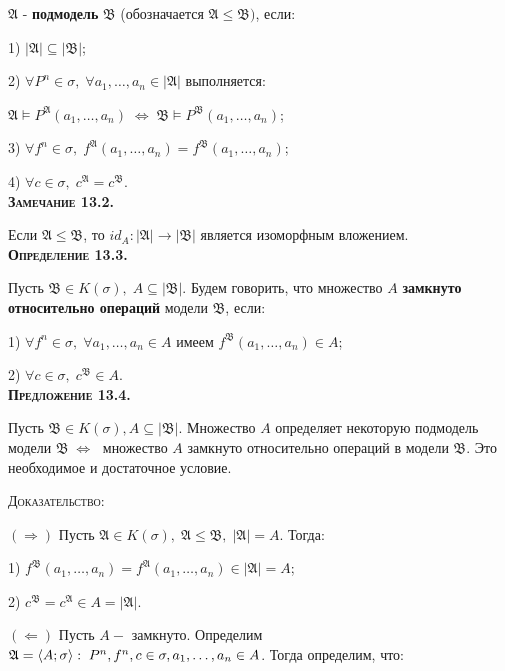 \documentclass[18pt, a4paper]{extarticle}
\begin{document}
$\mathfrak{A}$ -  \textbf{подмодель} $\mathfrak{B}$ (обозначается $\mathfrak{A}\leqslant\mathfrak{B})$, если:

1) $|\mathfrak{A}|\subseteq |\mathfrak{B}|$;

2) $\forall P^n\in\sigma,\;\forall a_1,\dots,a_n\in|\mathfrak{A}|$ выполняется:

\qquad$\mathfrak{A}\vDash P^{\mathfrak{A}}(a_1,\dots,a_n)\;\Leftrightarrow\;\mathfrak{B}\vDash P^{\mathfrak{B}}(a_1,\dots,a_n)$;

3) $\forall f^n\in\sigma,\; f^{\mathfrak{A}}(a_1,\dots,a_n)=f^{\mathfrak{B}}(a_1,\dots,a_n)$;

4) $\forall c\in\sigma,\; c^{\mathfrak{A}}=c^{\mathfrak{B}}$.\\

\textbf{\textsc{Замечание 13.2.}} 

Если $\mathfrak{A}\leqslant\mathfrak{B}$, то $id_A:|\mathfrak{A}|\to|\mathfrak{B}|$ является изоморфным вложением.\\

\textbf{\textsc{Определение 13.3.}} 

Пусть $\mathfrak{B}\in K(\sigma), \;A\subseteq|\mathfrak{B}|$. Будем говорить, что множество $A$ \textbf{замкнуто относительно операций}
 модели $\mathfrak{B}$, если:
 
 1) $\forall f^n\in\sigma,\;\forall a_1,\dots,a_n\in A$ имеем $f^{\mathfrak{B}}(a_1,\dots,a_n)\in A$;
 
 2) $\forall c\in\sigma,\;c^{\mathfrak{B}}\in A$.\\
 
\textbf{\textsc{Предложение 13.4.}} 

Пусть $\mathfrak{B}\in K(\sigma), A\subseteq|\mathfrak{B}|$. Множество $A$ определяет некоторую подмодель модели $\mathfrak{B}\;\Leftrightarrow\;$ множество $A$ замкнуто относительно операций в модели $\mathfrak{B}$. Это необходимое и достаточное условие.

\textsc{Доказательство:}

$\boxed{(\Rightarrow)}$ Пусть $\mathfrak{A}\in K(\sigma),\;\mathfrak{A}\leqslant\mathfrak{B},\;|\mathfrak{A}|=A$. Тогда:

1) $f^{\mathfrak{B}}(a_1,\dots,a_n)=f^{\mathfrak{A}}(a_1,\dots,a_n)\in|\mathfrak{A}|=A$;

2) $c^{\mathfrak{B}}=c^{\mathfrak{A}}\in A=|\mathfrak{A}|$.

$\boxed{(\Leftarrow)}$ Пусть $A-$ замкнуто. Определим $\mathfrak{A}=\langle A;\sigma\rangle:\;P^n,f^n, c\in\sigma,\newline a_1,\dots,a_n\in A$. Тогда определим, что:
\end{document}
